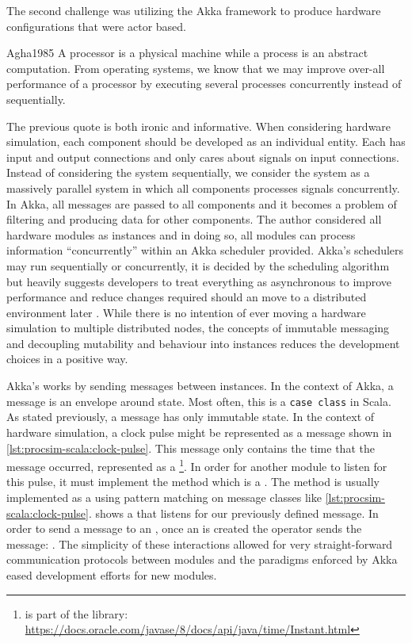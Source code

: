The second challenge was utilizing the Akka framework to produce hardware configurations that were actor based. \begin{displaycquote}{Agha1985}
    A processor is a physical machine while a process is an abstract computation. From operating systems, we know that we may improve over-all performance of a processor by executing several processes concurrently instead of sequentially.
\end{displaycquote}
The previous quote is both ironic and informative. When considering hardware simulation, each component should be developed as an individual entity. Each has input and output connections and only cares about signals on input connections. Instead of considering the system sequentially, we consider the system as a massively parallel system in which all components processes signals concurrently. In Akka, all messages are passed to all components and it becomes a problem of filtering and producing data for other components. The author considered all hardware modules as \akkaActor{} instances and in doing so, all modules can process information ``concurrently'' within an Akka scheduler provided. Akka's schedulers may run sequentially or concurrently, it is decided by the scheduling algorithm but heavily suggests developers to treat everything as asynchronous to improve performance and reduce changes required should an \akkaActor{} move to a distributed environment later \cite{TypesafeAkka2015}. While there is no intention of ever moving a hardware simulation to multiple distributed nodes, the concepts of immutable messaging and decoupling mutability and behaviour into \akkaActor{} instances reduces the development choices in a positive way. 

Akka's \akkaActor{} works by sending messages between \akkaActor{} instances. In the context of Akka, a message is an envelope around state. Most often, this is a \texttt{case class} in Scala. As stated previously, a message has only immutable state. In the context of hardware simulation, a clock pulse might be represented as a message shown in \cref{lst:procsim-scala:clock-pulse}. This message only contains the time that the message occurred, represented as a \footnote{ is part of the  library: \url{https://docs.oracle.com/javase/8/docs/api/java/time/Instant.html}}. In order for another module to listen for this pulse, it must implement the  method which is a . The  method is usually implemented as a  using pattern matching \cite{Scala-PatternMatching} on message classes like \cref{lst:procsim-scala:clock-pulse}.  shows a \akkaActor{} that listens for our previously defined  message. In order to send a message to an \akkaActor{}, once an \akkaActor{} is created the \scalainline{!} operator sends the message: . The simplicity of these interactions allowed for very straight-forward communication protocols between modules and the paradigms enforced by Akka eased development efforts for new modules.

